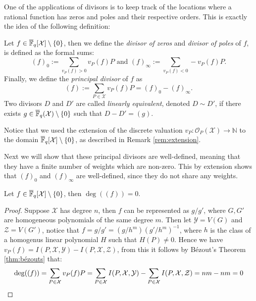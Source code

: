 One of the applications of divisors is to keep track of the locations where a rational function has zeros and poles and their respective orders. This is exactly the idea of the following definition:
\begin{definition}
  Let $f \in \overline{\mathbb{F}}_{q}[\mathcal{X}] \setminus \left\{0\right\}$, then we define the \textit{divisor of zeros} and \textit{divisor of poles}
  of $f$, is defined as the formal sums:
  \begin{equation*}
    (f)_{0} := \sum_{v_{P}(f) > 0} v_{P}(f) P  \text{  and  }  (f)_{\infty} := \sum_{v_{P}(f) < 0} -v_{P}(f) P.
  \end{equation*}
  Finally, we define the \textit{principal divisor} of $f$ as
  \begin{equation*}
    (f) := \sum_{P \in \mathcal{X}} v_{P}(f)P = (f)_{0} - (f)_{\infty}.
  \end{equation*}
  Two divisors $D$ and $D'$ are called \textit{linearly equivalent}, denoted $D \sim D'$, if there exists $g \in \overline{\mathbb{F}}_{q}(\mathcal{X}) \setminus \left\{0\right\}$ such that $D - D' = (g)$.
\end{definition}
Notice that we used the extension of the discrete valuation $v_{P}: \mathcal{O}_{P}(\mathcal{X}) \to \mathbb{N}$ to the domain $\overline{\mathbb{F}}_{q}[\mathcal{X}] \setminus \left\{0\right\}$, as described in Remark \ref{rem:extension}.

Next we will show that these principal divisors are well-defined, meaning that they have a finite number of weights which are non-zero. This by extension shows that $(f)_{0}$ and $(f)_{\infty}$ are well-defined, since they do not share any weights.
\begin{proposition}\label{prop:principal_divisors_are_well_defined}
  Let $f \in \overline{\mathbb{F}}_{q}[\mathcal{X}]\setminus \left\{0\right\}$, then $\deg((f)) = 0$.
\end{proposition}
\begin{proof}
  Suppose $\mathcal{X}$ has degree $n$, then $f$ can be represented as $g / g'$, where $G, G'$ are homogeneous polynomials of the same degree $m$. Then let $\mathcal{Y} = V(G)$ and $\mathcal{Z} = V(G')$, notice that $f = g / g' = (g / h^{m})(g' / h^{m})^{-1}$, where $h$ is the class of a homogenus linear polynomial $H$ such that $H(P) \neq 0$. Hence we have $v_P(f) = I(P, \mathcal{X}, \mathcal{Y}) - I(P, \mathcal{X}, \mathcal{Z})$, from this it follows by Bézout's Theorem \ref{thm:bézouts} that:
  \begin{equation*}
    \deg((f)) = \sum_{P \in \mathcal{X}} v_{P}(f) P = \sum_{P \in \mathcal{X}} I(P, \mathcal{X}, \mathcal{Y}) - \sum_{P \in \mathcal{X}} I(P, \mathcal{X}, \mathcal{Z}) = nm - nm = 0 \qedhere
  \end{equation*}
\end{proof}

